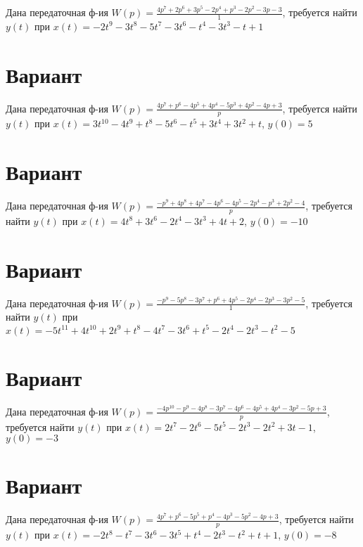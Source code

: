 \documentclass{article}
\begin{document}
Дана передаточная ф-ия $W(p)=\frac{4p^{7}+2p^{6}+3p^{5}-2p^{4}+p^{3}-2p^{2}-3p-3}{1}$, требуется найти $y(t)$ при $x(t)=-2t^{9}-3t^{8}-5t^{7}-3t^{6}-t^{4}-3t^{3}-t+1$



\section{Вариант}

Дана передаточная ф-ия $W(p)=\frac{4p^{7}+p^{6}-4p^{5}+4p^{4}-5p^{3}+4p^{2}-4p+3}{p}$, требуется найти $y(t)$ при $x(t)=3t^{10}-4t^{9}+t^{8}-5t^{6}-t^{5}+3t^{4}+3t^{2}+t$, $y(0)=5$



\section{Вариант}

Дана передаточная ф-ия $W(p)=\frac{-p^{9}+4p^{8}+4p^{7}-4p^{6}-4p^{5}-2p^{4}-p^{3}+2p^{2}-4}{p}$, требуется найти $y(t)$ при $x(t)=4t^{8}+3t^{6}-2t^{4}-3t^{3}+4t+2$, $y(0)=-10$



\section{Вариант}

Дана передаточная ф-ия $W(p)=\frac{-p^{9}-5p^{8}-3p^{7}+p^{6}+4p^{5}-2p^{4}-2p^{3}-3p^{2}-5}{1}$, требуется найти $y(t)$ при $x(t)=-5t^{11}+4t^{10}+2t^{9}+t^{8}-4t^{7}-3t^{6}+t^{5}-2t^{4}-2t^{3}-t^{2}-5$



\section{Вариант}

Дана передаточная ф-ия $W(p)=\frac{-4p^{10}-p^{9}-4p^{8}-3p^{7}-4p^{6}-4p^{5}+4p^{4}-3p^{2}-5p+3}{p}$, требуется найти $y(t)$ при $x(t)=2t^{7}-2t^{6}-5t^{5}-2t^{3}-2t^{2}+3t-1$, $y(0)=-3$



\section{Вариант}

Дана передаточная ф-ия $W(p)=\frac{4p^{7}+p^{6}-5p^{5}+p^{4}-4p^{3}-5p^{2}-4p+3}{p}$, требуется найти $y(t)$ при $x(t)=-2t^{8}-t^{7}-3t^{6}-3t^{5}+t^{4}-2t^{3}-t^{2}+t+1$, $y(0)=-8$
\end{document}
